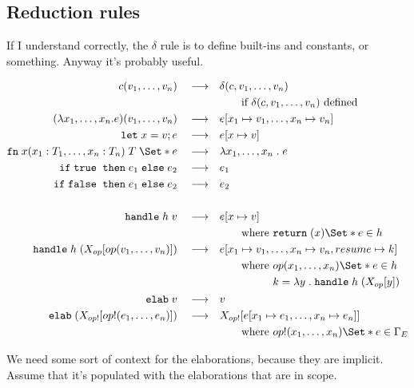 \documentclass{article}
\newcommand\kw[1]{\mathbf{\mathtt{#1}}\;}
\newcommand\true{\kw{true}}
\newcommand\false{\kw{false}}
\newcommand\val{\kw{let}}
\newcommand\fn{\kw{fn}}
\newcommand\return[0]{\kw{return}}
\newcommand\cond[3]{\kw{if} #1\;\kw{then} #2\;\kw{else} #3}
\newcommand\handle[2]{\kw{handle} #1\;#2}
\newcommand\elab[1]{\kw{elab}#1}
\newcommand\f[2]{\lambda #1\;.\;#2}
\renewcommand\S{\Set*}
\begin{document}
\subsection{Reduction rules}

If I understand correctly, the $\delta$ rule is to define built-ins and constants, or something. Anyway it's probably useful.

\newcommand{\reduce}{\quad\longrightarrow\quad}
\begin{align*}
    c(v_1, \dots, v_n) \reduce& \delta(c, v_1, \dots, v_n) \\
    &\qquad\text{if } \delta(c, v_1, \dots, v_n) \text{ defined}\\
    (\lambda x_1, \dots, x_n . e) (v_1, \dots, v_n) \reduce& e[x_1 \mapsto v_1, \dots, x_n \mapsto v_n] \\
    \val x = v; e \reduce& e[x \mapsto v] \\
    \fn x(x_1: T_1, \dots, x_n: T_n)\;T\;\S{ e } \reduce& \f{x_1,\dots,x_n}{e}\\
    \cond{\true}{e_1}{e_2} \reduce& e_1 \\
    \cond{\false}{e_1}{e_2} \reduce& e_2 \\
    \\
    \handle{h}{v} \reduce& e[x\mapsto v] \\
    &\qquad\text{where } \return(x) \S{ e } \in h\\
    \handle{h}{(X_{op}[op(v_1, \dots, v_n)])} \reduce& e[x_1\mapsto v_1, \dots, x_n\mapsto v_n, resume \mapsto k] \\
    &\qquad \text{where } \begin{aligned}[t]
        & op(x_1, \dots, x_n) \S{e} \in h\\
        & k = \f{y}{\handle h (X_{op}[y])}
    \end{aligned}\\
    \elab v \reduce& v\\
    \elab (X_{op!}[op!(e_1, \dots, e_n)]) \reduce& X_{op!}[e[x_1 \mapsto e_1, \dots, x_n \mapsto e_n]] \\
    &\qquad \text{where } op!(x_1, \dots, x_n) \S{e} \in \Gamma_E \\
\end{align*}

We need some sort of context for the elaborations, because they are implicit. Assume that it's populated with the elaborations that are in scope.
\end{document}
